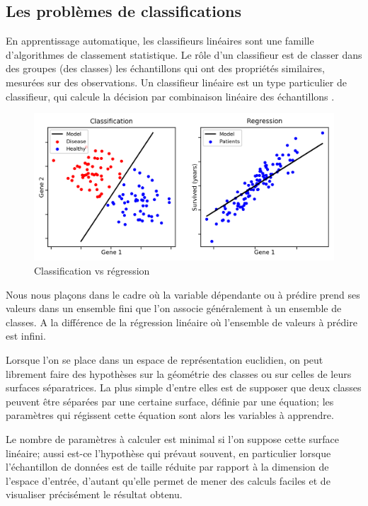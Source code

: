 	
	\subsection{Les problèmes de classifications}
		En apprentissage automatique, les classifieurs linéaires sont une famille d'algorithmes de classement statistique. Le rôle d'un classifieur est de classer dans des groupes (des classes) les échantillons qui ont des propriétés similaires, mesurées sur des observations. Un classifieur linéaire est un type particulier de classifieur, qui calcule la décision par combinaison linéaire des échantillons \cite{antoine2018apprentissage}.
		
		\begin{figure}[bth]%
			\centering
			\includegraphics[width=15cm]{images/classification_vs_regression.png}
			\caption{Classification vs régression \cite[image de][]{ml2008python}
			}
			\label{fig:class_vs_reg}
		\end{figure}
		
		Nous nous plaçons dans le cadre où la variable dépendante ou à prédire prend ses valeurs dans un ensemble fini que l'on associe généralement à un ensemble de classes. A la différence de la régression linéaire où l’ensemble de valeurs à prédire est infini.
		
		Lorsque l'on se place dans un espace de représentation euclidien, on peut librement faire des hypothèses sur la géométrie des classes ou sur celles de leurs surfaces séparatrices. La plus simple d'entre elles est de supposer que deux classes peuvent être séparées par une certaine surface, définie par une équation; les paramètres qui régissent cette équation sont alors les variables à apprendre.
		
		Le nombre de paramètres à calculer est minimal si l'on suppose cette surface linéaire; aussi est-ce l'hypothèse qui prévaut souvent, en particulier lorsque l'échantillon de données est de taille réduite par rapport à la dimension de l'espace d'entrée, d'autant qu'elle permet de mener des calculs faciles et de visualiser précisément le résultat obtenu.
		
